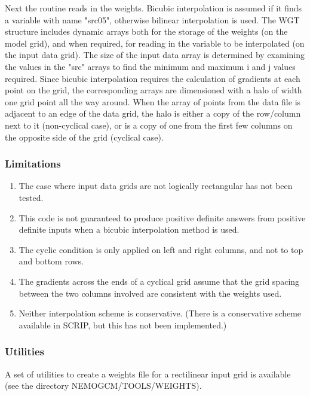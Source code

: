 \documentclass[../main/NEMO_manual]{subfiles}
\begin{document}
Next the routine reads in the weights.
Bicubic interpolation is assumed if it finds a variable with name "src05", otherwise bilinear interpolation is used.
The WGT structure includes dynamic arrays both for the storage of the weights (on the model grid),
and when required, for reading in the variable to be interpolated (on the input data grid).
The size of the input data array is determined by examining the values in the "src" arrays to
find the minimum and maximum i and j values required.
Since bicubic interpolation requires the calculation of gradients at each point on the grid,
the corresponding arrays are dimensioned with a halo of width one grid point all the way around.
When the array of points from the data file is adjacent to an edge of the data grid,
the halo is either a copy of the row/column next to it (non-cyclical case),
or is a copy of one from the first few columns on the opposite side of the grid (cyclical case).

\subsubsection{Limitations}
\label{subsec:SBC_iof_lim}

\begin{enumerate}  
\item
  The case where input data grids are not logically rectangular has not been tested.
\item
  This code is not guaranteed to produce positive definite answers from positive definite inputs when
  a bicubic interpolation method is used.
\item
  The cyclic condition is only applied on left and right columns, and not to top and bottom rows.
\item
  The gradients across the ends of a cyclical grid assume that the grid spacing between
  the two columns involved are consistent with the weights used.
\item
  Neither interpolation scheme is conservative. (There is a conservative scheme available in SCRIP,
  but this has not been implemented.)
\end{enumerate}

\subsubsection{Utilities}
\label{subsec:SBC_iof_util}

A set of utilities to create a weights file for a rectilinear input grid is available
(see the directory NEMOGCM/TOOLS/WEIGHTS).
\end{document}
